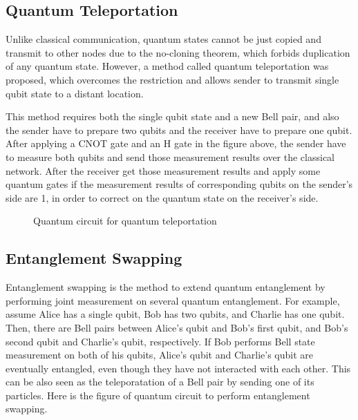 \subsection{Quantum Teleportation}

Unlike classical communication, quantum states cannot be just copied and transmit to other nodes due to the no-cloning theorem, which forbids duplication of any quantum state.  However, a method called quantum teleportation was proposed, which overcomes the restriction and allows sender to transmit single qubit state to a distant location. 
 		
This method requires both the single qubit state and a new Bell pair, and also the sender have to prepare two qubits and the receiver have to prepare one qubit.  After applying a CNOT gate and an H gate in the figure above, the sender have to measure both qubits and send those measurement results over the classical network.  After the receiver get those measurement results and apply some quantum gates if the measurement results of corresponding qubits on the sender's side are 1, in order to correct on the quantum state on the receiver's side.

\begin{figure}[ht]
  	\begin{center}
	\caption{Quantum circuit for quantum teleportation}
	\end{center}
\end{figure}

\newpage

\subsection{Entanglement Swapping}

Entanglement swapping is the method to extend quantum entanglement by performing joint measurement on several quantum entanglement.
For example, assume Alice has a single qubit, Bob has two qubits, and Charlie has one qubit. Then, there are Bell pairs between Alice's qubit and Bob's first qubit, and Bob's second qubit and Charlie's qubit, respectively.
If Bob performs Bell state measurement on both of his qubits, Alice's qubit and Charlie's qubit are eventually entangled, even though they have not interacted with each other.
This can be also seen as the teleporatation of a Bell pair by sending one of its particles.
Here is the figure of quantum circuit to perform entanglement swapping.

